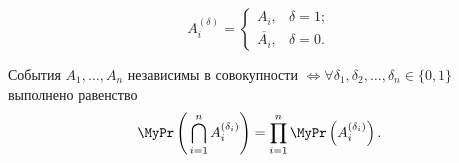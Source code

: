 \begin{symb}
	\begin{equation*}
		A_{i}^{(\delta)} =
		\begin{cases}
			A_{i},            & \delta = 1; \\
			\overline{A_{i}}, & \delta = 0. 
		\end{cases}
	\end{equation*}
\end{symb}

\begin{namedthm}
    События $A_1, \ldots, A_n$ независимы в совокупности $\iff \forall \delta_1, \delta_2, \ldots, \delta_n \in \{0, 1\}$ выполнено равенство
	\begin{equation*}
		\MyPr\left(\, \bigcap_{i=1}^{n} A_{i}^{\left( \delta_{i} \right)} \right)
		= \prod_{i=1}^{n}\MyPr\left( A_{i}^{\left(\delta_{i}\right)} \right).
	\end{equation*}
\end{namedthm}
